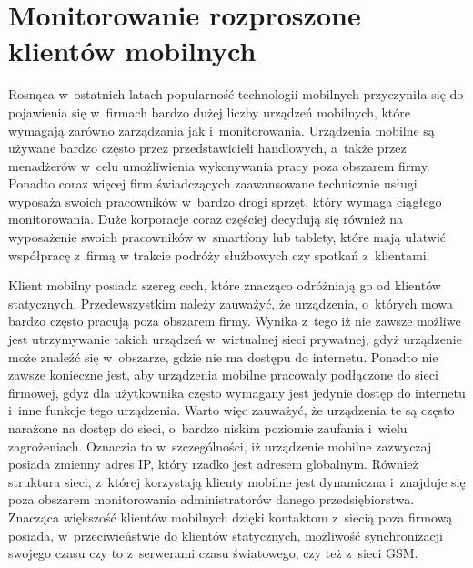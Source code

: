 \section[Monitorowanie rozproszone][Monitorowanie rozproszone klientów
mobilnych]{Monitorowanie rozproszone klientów mobilnych}

Rosnąca w~ostatnich latach popularność technologii mobilnych
przyczyniła się do pojawienia się w~firmach bardzo dużej liczby
urządzeń mobilnych, które wymagają zarówno zarządzania jak
i~monitorowania. Urządzenia mobilne są używane bardzo często przez
przedstawicieli handlowych, a~także przez menadżerów w~celu
umożliwienia wykonywania pracy poza obszarem firmy. Ponadto coraz
więcej firm świadczących zaawansowane technicznie usługi wyposaża
swoich pracowników w~bardzo drogi sprzęt, który wymaga ciągłego
monitorowania. Duże korporacje coraz częściej decydują się również na
wyposażenie swoich pracowników w~smartfony lub tablety, które mają
ułatwić współpracę z~firmą w trakcie podróży służbowych czy spotkań
z~klientami.

Klient mobilny posiada szereg cech, które znacząco odróżniają go od
klientów statycznych. Przedewszystkim należy zauważyć, że urządzenia,
o~których mowa bardzo często pracują poza obszarem firmy. Wynika
z~tego iż nie zawsze możliwe jest utrzymywanie takich urządzeń
w~wirtualnej sieci prywatnej, gdyż urządzenie może znaleźć się
w~obszarze, gdzie nie ma dostępu do internetu. Ponadto nie zawsze
konieczne jest, aby urządzenia mobilne pracowały podłączone do sieci
firmowej, gdyż dla użytkownika często wymagany jest jedynie dostęp do
internetu i~inne funkcje tego urządzenia. Warto więc zauważyć, że
urządzenia te są często narażone na dostęp do sieci, o~bardzo niskim
poziomie zaufania i~wielu zagrożeniach. Oznaczia to w~szczególności,
iż urządzenie mobilne zazwyczaj posiada zmienny adres IP, który rzadko
jest adresem globalnym. Również struktura sieci, z~której korzystają
klienty mobilne jest dynamiczna i~znajduje się poza obszarem
monitorowania administratorów danego przedsiębiorstwa. Znacząca
większość klientów mobilnych dzięki kontaktom z~siecią poza firmową
posiada, w~przeciwieństwie do klientów statycznych, możliwość
synchronizacji swojego czasu czy to z~serwerami czasu światowego, czy
też z~sieci GSM.

